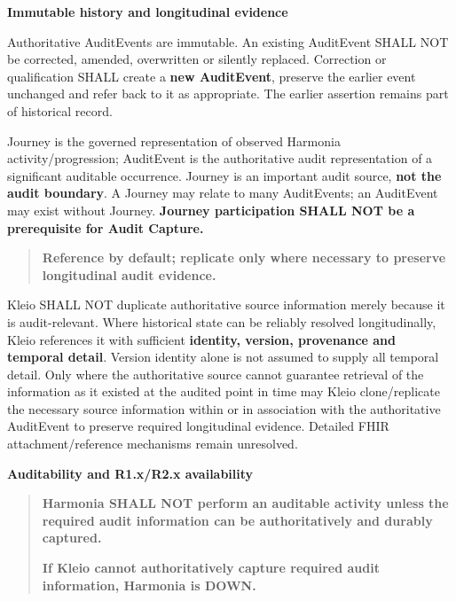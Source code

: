 \par\medskip\textbf{Immutable history and longitudinal evidence}\par


Authoritative AuditEvents are immutable. An existing AuditEvent SHALL NOT be
corrected, amended, overwritten or silently replaced. Correction or qualification
SHALL create a \textbf{new AuditEvent}, preserve the earlier event unchanged and refer
back to it as appropriate. The earlier assertion remains part of historical record.



Journey is the governed representation of observed Harmonia activity/progression;
AuditEvent is the authoritative audit representation of a significant auditable
occurrence. Journey is an important audit source, \textbf{not the audit boundary}.
A Journey may relate to many AuditEvents; an AuditEvent may exist without Journey.
\textbf{Journey participation SHALL NOT be a prerequisite for Audit Capture.}



\begin{quote}


\textbf{Reference by default; replicate only where necessary to preserve longitudinal
audit evidence.}



\end{quote}


Kleio SHALL NOT duplicate authoritative source information merely because it is
audit-relevant. Where historical state can be reliably resolved longitudinally,
Kleio references it with sufficient \textbf{identity, version, provenance and temporal
detail}. Version identity alone is not assumed to supply all temporal detail.
Only where the authoritative source cannot guarantee retrieval of the information
as it existed at the audited point in time may Kleio clone/replicate the necessary
source information within or in association with the authoritative AuditEvent to
preserve required longitudinal evidence. Detailed FHIR attachment/reference
mechanisms remain unresolved.







\par\medskip\textbf{Auditability and R1.x/R2.x availability}\par


\begin{quote}


\textbf{Harmonia SHALL NOT perform an auditable activity unless the required audit
information can be authoritatively and durably captured.}



\textbf{If Kleio cannot authoritatively capture required audit information, Harmonia
is DOWN.}



\end{quote}



